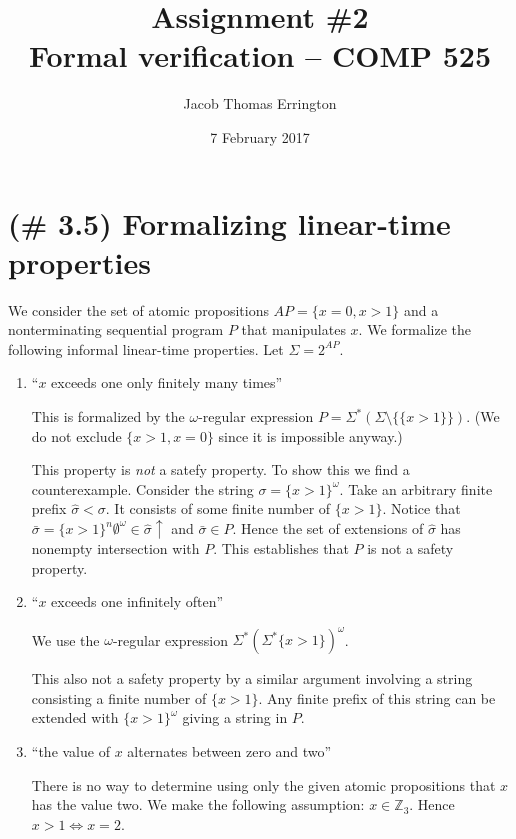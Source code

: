 \documentclass[letterpaper,11pt]{article}
\author{Jacob Thomas Errington}
\title{Assignment \#2\\Formal verification -- COMP 525}
\date{7 February 2017}
\newcommand{\Z}{\mathbb{Z}}
\newcommand{\up}{\uparrow}
\newcommand{\enumalpha}{\renewcommand\labelenumi{(\alph{enumi})}}
\begin{document}
\maketitle

\section{(\# 3.5) Formalizing linear-time properties}

We consider the set of atomic propositions $AP = \{x = 0, x > 1\}$ and a
nonterminating sequential program $P$ that manipulates $x$. We formalize the
following informal linear-time properties. Let $\Sigma = 2^{AP}$.

\begin{enumerate}
        \enumalpha \setcounter{enumi}{4}
    \item ``$x$ exceeds one only finitely many times''

        This is formalized by the $\omega$-regular expression
        $P = \Sigma^* (\Sigma \setminus \{ \{x>1\} \})$.
        (We do not exclude $\{x>1, x=0\}$ since it is impossible anyway.)

        This property is \emph{not} a satefy property. To show this we find a
        counterexample. Consider the string $\sigma = \{x > 1\}^\omega$. Take
        an arbitrary finite prefix $\hat \sigma < \sigma$. It consists of some
        finite number of $\{x > 1\}$. Notice that
        $\bar \sigma = \{x > 1\}^n \emptyset^\omega \in \hat \sigma \up$ and
        $\bar \sigma \in P$. Hence the set of extensions of $\hat \sigma$ has
        nonempty intersection with $P$. This establishes that $P$ is not a
        safety property.

    \item ``$x$ exceeds one infinitely often''

        We use the $\omega$-regular expression
        $\Sigma^* (\Sigma^* \{x>1\})^\omega$.

        This also not a safety property by a similar argument involving a
        string consisting a finite number of $\{x > 1\}$. Any finite prefix of
        this string can be extended with $\{x > 1\}^\omega$ giving a string in
        $P$.

    \item ``the value of $x$ alternates between zero and two''

        There is no way to determine using only the given atomic propositions
        that $x$ has the value two. We make the following assumption:
        $x \in \Z_3$. Hence $x > 1 \iff x = 2$.


\end{enumerate}
\end{document}
